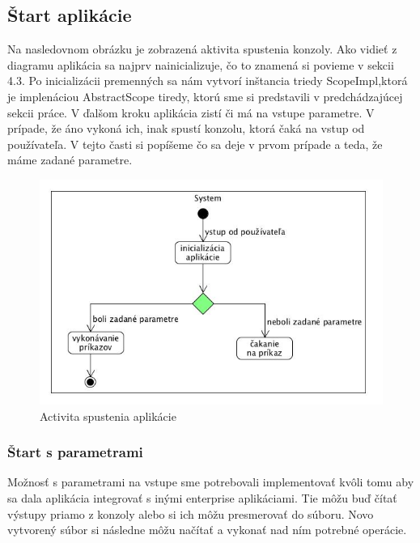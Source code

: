 \subsection{Štart aplikácie}
\indent  Na nasledovnom obrázku je zobrazená aktivita spustenia konzoly. Ako vidieť z diagramu aplikácia sa najprv nainicializuje, čo to znamená si povieme v sekcii 4.3. Po inicializácii premenných sa nám vytvorí inštancia triedy ScopeImpl,ktorá je implenáciou AbstractScope tiredy, ktorú sme si predstavili v predchádzajúcej sekcii práce. V ďalšom kroku aplikácia zistí či má na vstupe parametre. V prípade, že áno vykoná ich, inak spustí konzolu, ktorá čaká na vstup od používateľa. V tejto časti si popíšeme čo sa deje v prvom prípade a teda, že máme zadané parametre. 
\begin{figure}[!htbp]
	\centering
	\includegraphics[width=\linewidth]{img/System.jpg}
	\caption{Activita spustenia aplikácie}
	\label{fig:test}
\end{figure}
\subsubsection{Štart s parametrami}
\indent Možnosť s parametrami na vstupe sme potrebovali implementovať kvôli tomu aby sa dala aplikácia integrovať s inými enterprise aplikáciami. Tie môžu buď čítať výstupy priamo z konzoly alebo si ich môžu presmerovať do súboru. Novo vytvorený súbor si následne môžu načítať a vykonať nad ním potrebné operácie.
\newpage
